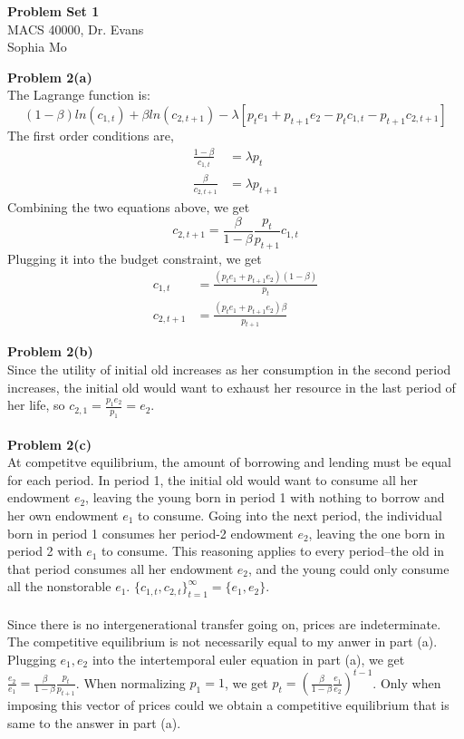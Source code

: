 \documentclass[letterpaper,12pt]{article}
\theoremstyle{definition}
\begin{document}
\begin{flushleft}
  \textbf{\large{Problem Set 1}} \\
  MACS 40000, Dr. Evans \\
  Sophia Mo
\end{flushleft}

\vspace{5mm}

\noindent\textbf{Problem 2(a)}\\
The Lagrange function is:
\begin{equation*}
  (1-\beta)ln(c_{1,t})+\beta ln(c_{2, {t+1}})-\lambda[p_te_1+p_{t+1}e_2-p_tc_{1,t}-p_{t+1}c_{2, t+1}]
\end{equation*}
The first order conditions are,
\begin{align*}
\frac{1-\beta}{c_{1,t}}&=\lambda p_t\\
\frac{\beta}{c_{2, {t+1}}}&=\lambda p_{t+1}
\end{align*}
Combining the two equations above, we get
\begin{equation*}
  c_{2,{t+1}}=\frac{\beta}{1-\beta}\frac{p_t}{p_{t+1}}c_{1,t}
\end{equation*}
Plugging it into the budget constraint, we get
\begin{align*}
c_{1,t} &= \frac{(p_te_1+p_{t+1}e_2)(1-\beta)}{p_t}\\
c_{2,t+1}&= \frac{(p_te_1+p_{t+1}e_2)\beta}{p_{t+1}}
\end{align*}

\noindent\textbf{Problem 2(b)}\\
Since the utility of initial old increases as her consumption in the second period increases, the initial old would want to exhaust her resource in the last period of her life, so $c_{2,1}=\frac{p_1e_2}{p_1}=e_2$. \\
\\
\noindent\textbf{Problem 2(c)}\\
At competitve equilibrium, the amount of borrowing and lending must be equal for each period. In period 1, the initial old would want to consume all her endowment $e_2$, leaving the young born in period 1 with nothing to borrow and her own endowment $e_1$ to consume. Going into the next period, the individual born in period 1 consumes her period-2 endowment $e_2$, leaving the one born in period 2 with $e_1$ to consume. This reasoning applies to every period--the old in that period consumes all her endowment $e_2$, and the young could only consume all the nonstorable $e_1$. $\{c_{1,t}, c_{2,t}\}_{t=1}^\infty = \{e_1, e_2\} $.\\
\\
Since there is no intergenerational transfer going on, prices are indeterminate. The competitive equilibrium is not necessarily equal to my anwer in part (a). Plugging $e_1, e_2$ into the intertemporal euler equation in part (a), we get $\frac{e_2}{e_1}=\frac{\beta}{1-\beta} \frac{p_{t}}{p_{t+1}}$. When normalizing $p_1=1$, we get $p_t = (\frac{\beta}{1-\beta}\frac{e_1}{e_2})^{t-1}$. Only when imposing this vector of prices could we obtain a competitive equilibrium that is same to the answer in part (a).
\end{document}
